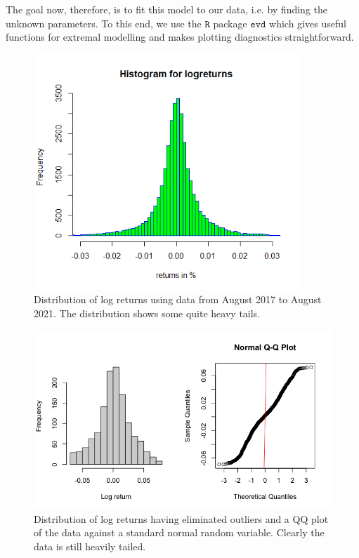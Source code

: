\documentclass[twoside]{report}
\newcommand{\code}{\texttt}
\begin{document}
\begin{spacing}{1}
The goal now, therefore, is to fit this model to our data, i.e. by finding the unknown parameters. To this end, we use the $\code{R}$ package $\code{evd}$ which gives useful functions for extremal modelling and makes plotting diagnostics straightforward. 
\begin{figure}
    \centering
    \includegraphics[width=\linewidth, height=3.5in]{TestPlots/Histogram log-returns2.png}
    \caption{Distribution of log returns using data from August 2017 to August 2021. The distribution shows some quite heavy tails.}
    \label{fig:hist_logreturn_17_21}
\end{figure}

\begin{figure}
    \centering
    \includegraphics[width=\linewidth]{Extremal Modelling/distplots_sans_outliers.png}
    \caption{Distribution of log returns having eliminated outliers and a QQ plot of the data against a standard normal random variable. Clearly the data is still heavily tailed.}
    \label{fig:distplots_sans_outliers}
\end{figure}




\end{spacing}
\end{document}
